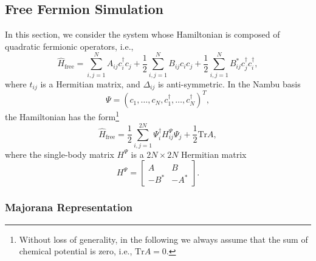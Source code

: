 \documentclass[aps,prb,superscriptaddress,nofootinbib]{revtex4}
\begin{document}
\subsection{Free Fermion Simulation}

In this section, we consider the system whose Hamiltonian is composed of quadratic fermionic operators, i.e.,
\begin{equation}
	\hat H_{\mathrm{free}} = \sum_{i,j=1}^N A_{ij} c_i^\dagger c_j + \frac{1}{2}\sum_{i,j=1}^N B_{ij} c_i c_j + \frac{1}{2}\sum_{i,j=1}^N B_{ij}^* c_j^\dagger c_i^\dagger, \label{eq:lattice-free-fermion-hamiltonian}
\end{equation}
where $t_{ij}$ is a Hermitian matrix, and $\Delta_{ij}$ is anti-symmetric.
In the Nambu basis 
\begin{equation}
	\Psi = (c_1,\dots,c_N,c_1^\dagger,\dots,c_N^\dagger)^T,
\end{equation}
the Hamiltonian has the form\footnote{Without loss of generality, in the following we always assume that the sum of chemical potential is zero, i.e., $\mathrm{Tr} A=0$.}
\begin{equation}
	\hat H_{\mathrm{free}} = \frac{1}{2} \sum_{i,j=1}^{2N} \Psi^\dagger_i H_{ij}^{\Psi} \Psi_j + \frac{1}{2}\mathrm{Tr}A,
\end{equation}
where the single-body matrix $H^{\Psi}$ is a $2N\times 2N$ Hermitian matrix
\begin{equation}
	H^{\Psi} = \left[\begin{array}{cc} 
		A & B \\
		-B^* & -A^* 
	\end{array}\right].
\end{equation}

\subsubsection{Majorana Representation}
\end{document}
